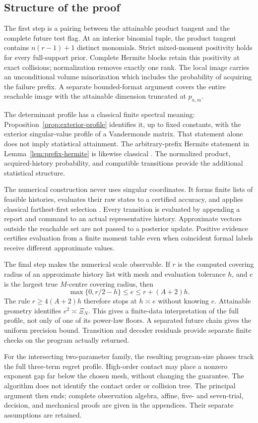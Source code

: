 \subsection{Structure of the proof}
The first step is a pairing between the attainable product tangent and
the complete future test flag. At an interior binomial tuple, the product
tangent contains $n(r-1)+1$ distinct monomials. Strict mixed-moment
positivity holds for every full-support prior. Complete Hermite blocks
retain this positivity at exact collisions; normalization removes exactly
one rank. The local image carries an unconditional volume minorization
which includes the probability of acquiring the failure prefix. A
separate bounded-format argument covers the entire reachable image with
the attainable dimension truncated at $p_{n,m}$.

The determinant profile has a classical finite spectral meaning:
Proposition~\ref{prop:exterior-profile} identifies it, up to fixed
constants, with the exterior singular-value profile of a Vandermonde
matrix. That statement alone does not imply statistical attainment.
The arbitrary-prefix Hermite statement in
Lemma~\ref{lem:prefix-hermite} is likewise classical
\cite[Proposition 7]{deBoor}. The normalized product, acquired-history
probability, and compatible transitions provide the additional
statistical structure.

The numerical construction never uses singular coordinates. It forms
finite lists of feasible histories, evaluates their raw states to a
certified accuracy, and applies classical farthest-first selection
\cite{Gonzalez}. Every transition is evaluated by appending a report and
command to an actual representative history. Approximate vectors outside
the reachable set are not passed to a posterior update. Positive evidence
certifies evaluation from a finite moment table even when coincident
formal labels receive different approximate values.

The final step makes the numerical scale observable. If $r$ is the
computed covering radius of an approximate history list with mesh and
evaluation tolerance $h$, and $e$ is the largest true $M$-centre covering
radius, then
\[
 \max\{0,r/2-h\}\le e\le r+(A+2)h.
\]
The rule $r\ge4(A+2)h$ therefore stops at $h\asymp e$ without knowing
$e$. Attainable geometry identifies $e^2\asymp\Xi_N$. This gives a
finite-data interpretation of the full profile, not only of one of its
power-law floors. A separated future chain gives the uniform precision
bound. Transition and decoder residuals provide separate finite checks
on the program actually returned.

For the intersecting two-parameter family, the resulting program-size
phases track the full three-term regret profile. High-order contact may
place a nonzero exponent gap far below the chosen mesh, without changing
the guarantee. The algorithm does not identify the contact order or
collision tree. The principal argument then ends; complete observation
algebra, affine, five- and seven-trial, decision, and mechanical proofs
are given in the appendices. Their separate assumptions are retained.
